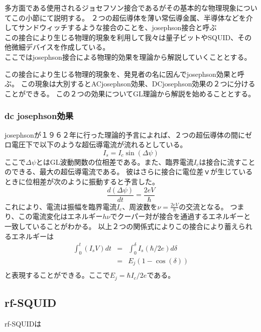             多方面である使用されるジョセフソン接合であるがその基本的な物理現象についてこの小節にて説明する。
            ２つの超伝導体を薄い常伝導金属、半導体などを介してサンドウィッチするような接合のことを、josephson接合と呼ぶ\\
            この接合により生じる物理的現象を利用して我々は量子ビットやSQUID、その他微細デバイスを作成している。\\
            ここではjosephson接合による物理的効果を理論から解説していくこととする。

    
            この接合により生じる物理的現象を、発見者の名に因んでjosephson効果と呼ぶ。
            この現象は大別するとACjosephson効果、DCjosephson効果の２つに分けることができる。
            この２つの効果についてGL理論から解説を始めることとする。
            \subsubsection{dc josephson効果}
                josephsonが１９６２年に行った理論的予言によれば、２つの超伝導体の間にゼロ電圧下で以下のような超伝導電流が流れるとしている。
                \begin{equation*}
                    I_s = I_c \sin(\Delta \psi)
                \end{equation*}
                ここで$\Delta \psi$とはGL波動関数の位相差である。また、臨界電流$I_c$は接合に流すことのできる、最大の超伝導電流である。
                彼はさらに接合に電位差ｖが生じているときに位相差が次のように振動すると予言した。
                \begin{equation*}
                    \frac{d(\Delta \psi)}{dt} = \frac{2eV}{\hbar}
                \end{equation*}
                これにより、電流は振幅を臨界電流$I_c$、周波数を$\nu = \frac{2eV}{h}$の交流となる。
                つまり、この電流変化はエネルギー$h\nu$でクーパー対が接合を通過するエネルギーと一致していることがわかる。
                以上２つの関係式によりこの接合により蓄えられるエネルギーは
                \begin{eqnarray}
                    \int_0^{t} (I_s V)dt&=&\int_{0}^{\delta} I_s(\hbar/2e)d\delta\\
                    &=&E_j(1-\cos(\delta))\\
                \end{eqnarray}
                と表現することができる。ここで$E_j=\hbar I_c/2e$である。
    \subsection{rf-SQUID}
                rf-SQUIDは
